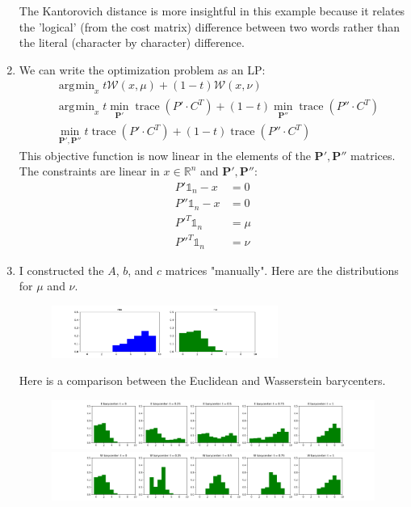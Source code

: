 \documentclass[11pt]{article}
\DeclareMathOperator*{\argmin}{arg\!min}
\DeclareMathOperator*{\trace}{trace}
\begin{document}
\begin{solution}
\begin{enumerate}
The Kantorovich distance is more insightful in this example because it relates the 'logical' (from the cost matrix) difference between two words rather than the literal (character by character) difference.

\item We can write the optimization problem as an LP:
\begin{align*}
    &\argmin_{x} t \mathcal{W}(x,\mu) + (1-t)\mathcal{W}(x,\nu) \\
    &\argmin_{x} t \min_{\mathbf{P'}} \trace(P' \cdot C^T) + (1-t) \min_{\mathbf{P''}} \trace(P'' \cdot C^T) \\
    &\min_{\mathbf{P'},\mathbf{P''}} t \trace(P' \cdot C^T) + (1-t) \trace(P'' \cdot C^T)
\end{align*}
This objective function is now linear in the elements of the $\mathbf{P'},\mathbf{P''}$ matrices. The constraints are linear in $x \in \mathbb{R}^n$ and $\mathbf{P'}, \mathbf{P''}$:
\begin{align*}
    P' \mathbb{1}_n - x &= 0 \\
    P'' \mathbb{1}_n - x &= 0 \\
    P'^T \mathbb{1}_n &= \mu \\
    P''^T \mathbb{1}_n &= \nu
\end{align*}

\item I constructed the $A$, $b$, and $c$ matrices "manually". Here are the distributions for $\mu$ and $\nu$.

\begin{figure}[H]
    \centerline{\includegraphics[width=0.7\textwidth]{problem1_mu_nu.png}}
\end{figure}

Here is a comparison between the Euclidean and Wasserstein barycenters.
\begin{figure}[H]
    \centerline{\includegraphics[width=\textwidth]{problem1_e_barycenter.png}}
    \centerline{\includegraphics[width=\textwidth]{problem1_w_barycenter.png}}
\end{figure}


\end{enumerate}
\end{solution}
\end{document}
